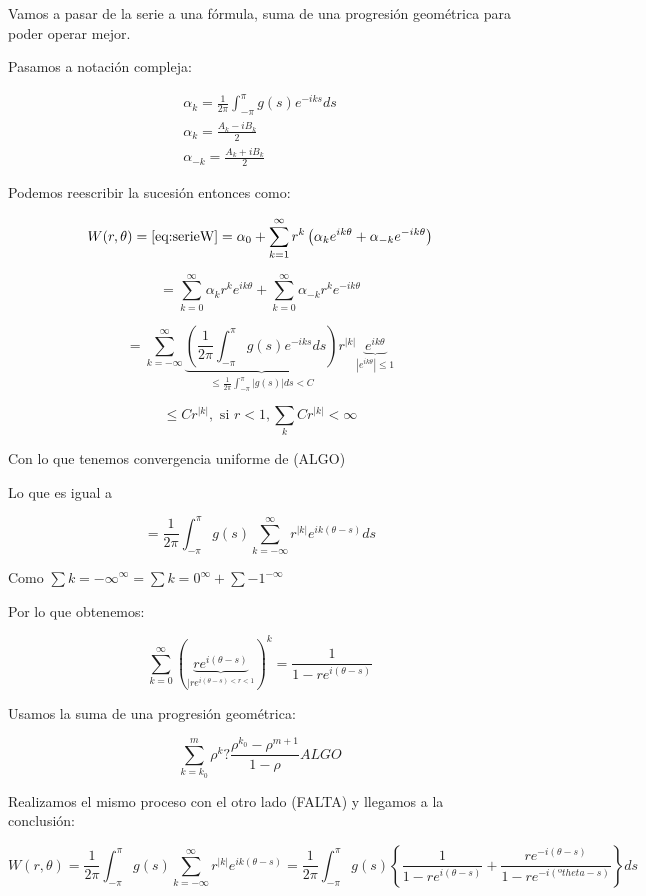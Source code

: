 		Vamos a pasar de la serie a una fórmula, suma de una progresión geométrica para poder operar mejor.


		Pasamos a notación compleja:

		\[
		\begin{array}{l}
			\alpha_k = \frac{1}{2\pi} \int_{-\pi}^{\pi} g(s) e^{-iks} ds \\
			\alpha_k = \frac{A_k - iB_k}{2} \\
			\alpha_{-k} = \frac{A_k + iB_k}{2}
		\end{array}
		\]

		Podemos reescribir la sucesión entonces como:

		\[W(r, \theta) = \eqref{eq:serieW} = \alpha_0 + \sum_{k=1}^{\infty} r^k \left( \alpha_k e^{ik\theta} + \alpha_{-k} e^{-ik\theta} \right) \]

		\[ = \sum_{k=0}^{\infty} \alpha_k r^k e^{ik\theta} + \sum_{k=0}^{\infty} \alpha_{-k} r^k e^{-ik\theta} \]


		\[ = \sum_{k=-\infty}^{\infty} \underbrace{\left( \frac{1}{2\pi} \int_{-\pi}^{\pi} g(s) e^{-iks} ds \right)}_{\leq \frac{1}{2\pi} \int_{-\pi}^{\pi} |g(s)| ds < C} r ^{|k|} \underbrace{e^{ik\theta}}_{|e^{ik\theta}| \leq 1} \]


		\[ \leq C r^{|k|}, \text{ si } r < 1, \sum_k Cr^{|k|} < \infty  \]


		Con lo que tenemos convergencia uniforme de (ALGO)

		Lo que es igual a

		\[ = \frac{1}{2\pi} \int_{-\pi}^{\pi} g(s) \sum_{k=-\infty}^{\infty} r^{|k|} e^{ik(\theta-s)} ds \]

		Como $\sum\limits{k=-\infty}^\infty = \sum\limits{k=0}^\infty + \sum\limits{-1}^{-\infty}$

		Por lo que obtenemos:

		\[
		\sum_{k=0}^{\infty} \left(\underbrace{r e^{i (\theta-s)}}_{|re^{i(\theta-s) < r < 1}}\right)^k = \frac{1}{1-re^{i(\theta-s)}}
		\]


		Usamos la suma de una progresión geométrica:

		\[ \sum_{k=k_0}^m \rho^k ? \frac{\rho^{k_0} - \rho^{m+1}}{1-\rho} ALGO \]

		Realizamos el mismo proceso con el otro lado (FALTA) y llegamos a la conclusión:


		\[
		W(r,\theta) = \frac{1}{2\pi} \int_{-\pi}^\pi g(s) \sum_{k=-\infty}^\infty r^{|k|} e^{ik(\theta-s)} = \frac{1}{2\pi} \int_{-\pi}^\pi g(s) \left\{ \frac{1}{1-re^{i(\theta-s)}} + \frac{re^{-i(\theta-s)}}{1-re^{-i(ºtheta-s)}} \right\} ds	\]

